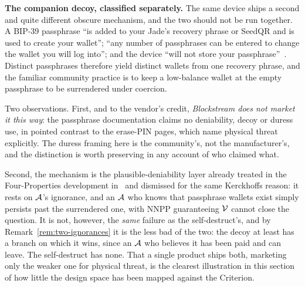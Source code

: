 \medskip\noindent\textbf{The companion decoy, classified separately.} The same
device ships a second and quite different obscure mechanism, and the two should
not be run together. A BIP-39 passphrase ``is added to your Jade's
recovery phrase or SeedQR and is used to create your wallet''; ``any number of
passphrases can be entered to change the wallet you will log into''; and the
device ``will not store your passphrase''~\cite{jade-passphrase}. Distinct
passphrases therefore yield distinct wallets from one recovery phrase, and the
familiar community practice is to keep a low-balance wallet at the empty
passphrase to be surrendered under coercion.

Two observations. First, and to the vendor's credit, \emph{Blockstream does not
market it this way}: the passphrase documentation claims no deniability, decoy
or duress use, in pointed contrast to the erase-PIN pages, which name physical
threat explicitly. The duress framing here is the community's,
not the manufacturer's, and the distinction is worth preserving in any account of
who claimed what.

Second, the mechanism is the plausible-deniability layer already treated in
the Four-Properties development in~\cite{deadly-race} and dismissed for the same Kerckhoffs reason: it rests on
$\mathcal{A}$'s ignorance, and an $\mathcal{A}$ who knows that passphrase wallets
exist simply persists past the surrendered one, with NNPP guaranteeing $\mathcal{V}$
cannot close the question. It is not, however, the \emph{same} failure as the
self-destruct's, and by Remark~\ref{rem:two-ignorances} it is the less bad of the
two: the decoy at least has a branch on which it wins, since an $\mathcal{A}$ who
believes it has been paid and can leave. The self-destruct has none. That a
single product ships both, marketing only the weaker one for physical threat, is
the clearest illustration in this section of how little the design space has been
mapped against the Criterion.

